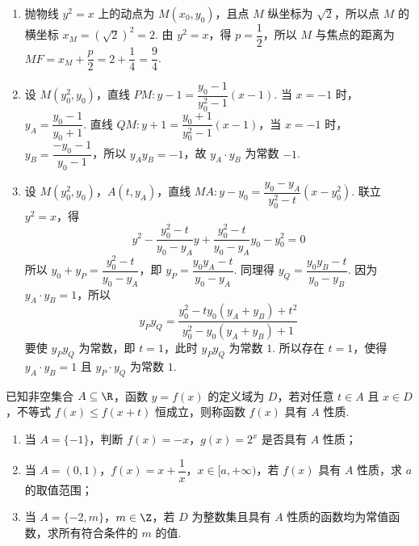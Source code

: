 \begin{solution}
\begin{enumerate}
\item 抛物线 \(y^2=x\) 上的动点为 \(M(x_0,y_0)\)，且点 \(M\) 纵坐标为 \(\sqrt{2}\)，所以点 \(M\) 的横坐标 \(x_M=(\sqrt{2})^2=2\). 由 \(y^2=x\)，得 \(p=\dfrac{1}{2}\)，所以 \(M\) 与焦点的距离为 \(MF=x_M+\dfrac{p}{2}=2+\dfrac{1}{4}=\dfrac{9}{4}\).
\item 设 \(M(y_0^2,y_0)\)，直线 \(PM\colon y-1=\dfrac{y_0-1}{y_0^2-1}(x-1)\). 当 \(x=-1\) 时，\(y_A=\dfrac{y_0-1}{y_0+1}\). 直线 \(QM\colon y+1=\dfrac{y_0+1}{y_0^2-1}(x-1)\)，当 \(x=-1\) 时，\(y_B=\dfrac{-y_0-1}{y_0-1}\)，所以 \(y_Ay_B=-1\)，故 \(y_A\cdot y_B\) 为常数 \(-1\).
\item 设 \(M(y_0^2,y_0)\)，\(A(t,y_A)\)，直线 \(MA\colon y-y_0=\dfrac{y_0-y_A}{y_0^2-t}(x-y_0^2)\). 联立 \(y^2=x\)，得
\[
y^2-\dfrac{y_0^2-t}{y_0-y_A}y+\dfrac{y_0^2-t}{y_0-y_A}y_0-y_0^2=0
\]
所以 \(y_0+y_P=\dfrac{y_0^2-t}{y_0-y_A}\)，即 \(y_P=\dfrac{y_0y_A-t}{y_0-y_A}\). 同理得 \(y_Q=\dfrac{y_0y_B-t}{y_0-y_B}\). 因为 \(y_A\cdot y_B=1\)，所以
\[
y_Py_Q=\dfrac{y_0^2-ty_0(y_A+y_B)+t^2}{y_0^2-y_0(y_A+y_B)+1}
\]
要使 \(y_Py_Q\) 为常数，即 \(t=1\)，此时 \(y_Py_Q\) 为常数 \(1\). 所以存在 \(t=1\)，使得 \(y_A\cdot y_B=1\) 且 \(y_P\cdot y_Q\) 为常数 \(1\).
\end{enumerate}
\end{solution}

\begin{problem}
已知非空集合 \(A\subseteq\R\)，函数 \(y=f(x)\) 的定义域为 \(D\)，若对任意 \(t\in A\) 且 \(x\in D\)，不等式 \(f(x)\leq f(x+t)\) 恒成立，则称函数 \(f(x)\) 具有 \(A\) 性质.
\begin{enumerate}
\item 当 \(A=\{-1\}\)，判断 \(f(x)=-x\)，\(g(x)=2^x\) 是否具有 \(A\) 性质；
\item 当 \(A=(0,1)\)，\(f(x)=x+\dfrac{1}{x}\)，\(x\in[a,+\infty)\)，若 \(f(x)\) 具有 \(A\) 性质，求 \(a\) 的取值范围；
\item 当 \(A=\{-2,m\}\)，\(m\in\Z\)，若 \(D\) 为整数集且具有 \(A\) 性质的函数均为常值函数，求所有符合条件的 \(m\) 的值.
\end{enumerate}
\end{problem}


